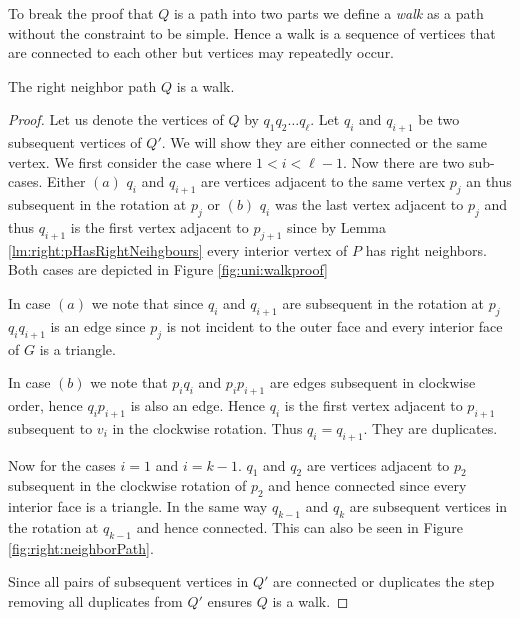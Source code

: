     To break the proof that $Q$ is a path into two parts we define a \emph{walk} as a path without the constraint to be simple. Hence a walk is a sequence of vertices that are connected to each other but vertices may repeatedly occur.
    \begin{lemma}
      \label{lm:right:neighborWalk}
      The right neighbor path $Q$ is a walk.
    \end{lemma}
    \begin{proof}
      Let us denote the vertices of $Q$ by $q_1 q_2 \ldots q_\ell$.
      Let $q_i$ and $q_{i+1}$ be two subsequent vertices of $Q'$. We will show they are either connected or the same vertex. We first consider the case where $1 < i < \ell-1$.
      Now there are two sub-cases. Either $(a)$ $q_i$ and $ q_{i+1}$ are vertices adjacent to the same vertex $p_j$ an thus subsequent in the rotation at $p_j$ or $(b)$ $q_i$ was the last vertex adjacent to $p_j$ and thus $q_{i+1}$ is the first vertex adjacent to $p_{j+1}$ since by Lemma \ref{lm:right:pHasRightNeihgbours} every interior vertex of $P$ has right neighbors.
      Both cases are depicted in Figure \ref{fig:uni:walkproof}

      In case $(a)$ we note that since $q_i$ and $q_{i+1}$ are subsequent in the rotation at $p_j$ $q_i q_{i+1}$ is an edge since $p_j$ is not incident to the outer face and every interior face of $G$ is a triangle.

      In case $(b)$ we note that $p_i q_i$ and $p_i p_{i+1}$ are edges subsequent in clockwise order, hence $q_{i} p_{i+1}$ is also an edge. Hence $q_i$ is the first vertex adjacent to $p_{i+1}$ subsequent to $v_i$ in the clockwise rotation. Thus $q_{i} = q_{i+1}$. They are duplicates.

      Now for the cases $i=1$ and $i=k-1$. $q_1$ and $q_2$ are vertices adjacent to $p_{2}$ subsequent in the clockwise rotation of ${p_2}$ and hence connected since every interior face is a triangle. In the same way $q_{k-1}$ and $q_k$ are subsequent vertices in the rotation at $q_{k-1}$ and hence connected. This can also be seen in Figure \ref{fig:right:neighborPath}.

      Since all pairs of subsequent vertices in $Q'$ are connected or duplicates the step removing all duplicates from $Q'$ ensures $Q$ is a walk.


\end{proof}

